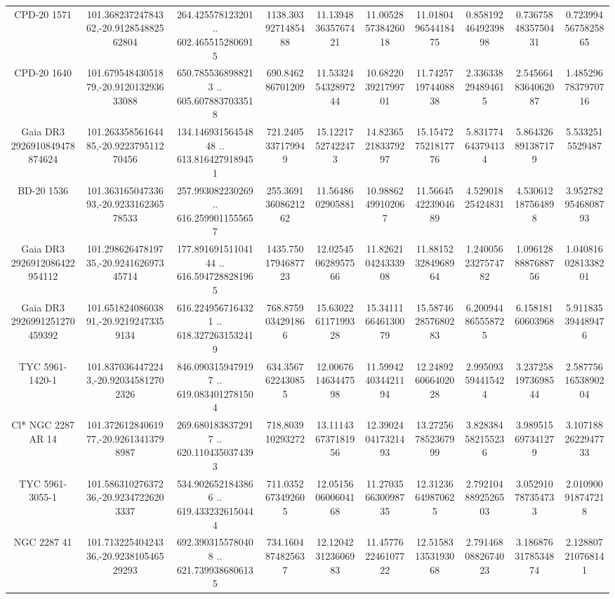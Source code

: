 \begin{table}
\begin{tabular}{cccccccccc}
CPD-20  1571 & 101.36823724784362,-20.912854882562804 & 264.425578123201 .. 602.4655152806915 & 1138.3039271485488 & 11.139483635767421 & 11.005285738426018 & 11.018049654418475 & 0.8581924649239898 & 0.7367584835750431 & 0.7239945675825865 \\
CPD-20  1640 & 101.67954843051879,-20.912013293633088 & 650.7855368988213 .. 605.6078837033518 & 690.846286701209 & 11.533245432897244 & 10.682203921799701 & 11.742571974408838 & 2.336338294894615 & 2.5456648364062087 & 1.4852967837970716 \\
Gaia DR3 2926910849478874624 & 101.26335856164485,-20.922379511270456 & 134.14693156454848 .. 613.8164279189451 & 721.2405337179949 & 15.12217527422473 & 14.823652183379297 & 15.154727521817776 & 5.831774643794134 & 5.864326891387179 & 5.5332515529487 \\
BD-20  1536 & 101.36316504733693,-20.923316236578533 & 257.993082230269 .. 616.2599011555657 & 255.36913608621262 & 11.5648602905881 & 10.98862499102067 & 11.566454223904689 & 4.52901825424831 & 4.530612187564898 & 3.9527829546808793 \\
Gaia DR3 2926912086422954112 & 101.29862647819735,-20.924162697345714 & 177.89169151104144 .. 616.5947288281965 & 1435.7501794687723 & 12.025450628957566 & 11.826210424333908 & 11.881523284968964 & 1.2400562327574782 & 1.0961288887688756 & 1.0408160281338201 \\
Gaia DR3 2926991251270459392 & 101.65182408603891,-20.92192473359134 & 616.2249567164321 .. 618.3272631532419 & 768.8759034291866 & 15.630226117199328 & 15.341116646130079 & 15.587462857680283 & 6.200944865558725 & 6.15818160603968 & 5.911835394489476 \\
TYC 5961-1420-1 & 101.8370364472243,-20.920345812702326 & 846.0903159479197 .. 619.0834012781504 & 634.3567622430855 & 12.006761463447598 & 11.599424034421194 & 12.248926066402028 & 2.995093594415424 & 3.2372581973698544 & 2.5877561653890204 \\
Cl* NGC 2287     AR      14 & 101.37261284061977,-20.92613413798987 & 269.6801838372917 .. 620.1104350374393 & 718.803910293272 & 13.111436737181956 & 12.390240417321493 & 13.272567852367999 & 3.828384582155236 & 3.989515697341279 & 3.1071882622947733 \\
TYC 5961-3055-1 & 101.58631027637236,-20.92347226203337 & 534.9026521843866 .. 619.4332326150444 & 711.0352673492605 & 12.051560600604168 & 11.270356630098735 & 12.31236649870625 & 2.7921048892526503 & 3.052910787354733 & 2.010900918747218 \\
NGC  2287    41 & 101.71322540424336,-20.923810546529293 & 692.3903155780408 .. 621.7399386806135 & 734.1604874825637 & 12.120423123606983 & 11.457762246107722 & 12.515831353193068 & 2.7914680882674023 & 3.1868763178534874 & 2.128807210768141 \\

\end{tabular}
\end{table}
